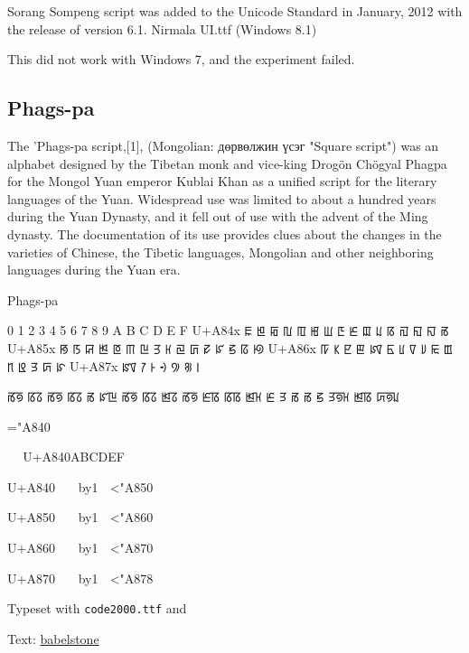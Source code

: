 Sorang Sompeng script was added to the Unicode Standard in January, 2012 with the release of version 6.1. Nirmala UI.ttf (Windows 8.1)



 	
This did not work with Windows 7, and the experiment failed. 

\subsection{Phags-pa}

The 'Phags-pa script,[1], (Mongolian: дөрвөлжин үсэг "Square script") was an alphabet designed by the Tibetan monk and vice-king Drogön Chögyal Phagpa for the Mongol Yuan emperor Kublai Khan as a unified script for the literary languages of the Yuan. Widespread use was limited to about a hundred years during the Yuan Dynasty, and it fell out of use with the advent of the Ming dynasty. The documentation of its use provides clues about the changes in the varieties of Chinese, the Tibetic languages, Mongolian and other neighboring languages during the Yuan era.

\newfontfamily{}

\begin{scriptexample}[]{Phags-pa}
\bgroup
\obeylines
\phagspa

 	0	1	2	3	4	5	6	7	8	9	A	B	C	D	E	F
U+A84x	ꡀ	ꡁ	ꡂ	ꡃ	ꡄ	ꡅ	ꡆ	ꡇ	ꡈ	ꡉ	ꡊ	ꡋ	ꡌ	ꡍ	ꡎ	ꡏ
U+A85x	ꡐ	ꡑ	ꡒ	ꡓ	ꡔ	ꡕ	ꡖ	ꡗ	ꡘ	ꡙ	ꡚ	ꡛ	ꡜ	ꡝ	ꡞ	ꡟ
U+A86x	ꡠ	ꡡ	ꡢ	ꡣ	ꡤ	ꡥ	ꡦ	ꡧ	ꡨ	ꡩ	ꡪ	ꡫ	ꡬ	ꡭ	ꡮ	ꡯ
U+A87x	ꡰ	ꡱ	ꡲ	ꡳ	꡴	꡵	꡶	


ꡏꡟ ꡋꡞ ꡏꡟ ꡋꡞ ꡏ ꡜꡖ ꡏꡟ ꡋꡞ ꡓꡞ ꡏꡟ
ꡈꡋ ꡋꡋ ꡓꡘ ꡈ ꡭ ꡏ ꡏ ꡝ ꡭꡟꡘ ꡓꡋ ꡮꡟꡊ
\egroup
\bgroup
\raggedright

\setcounter{glyphcount}{"A840}

\topline
\phagspa
\newcount\n
\n="A840

\def\htable{^^A
  \def\fm##1{\makebox[2em]##1}^^A
  U+A840\fm 0\fm1\fm2\fm3\fm4\fm5\fm 6\fm 7\fm 8\fm	9\fm A\fm B\fm C\fm D\fm E\fm F}

\htable\par
U+A840^^A 
\loop^^A
  \makebox[2em]{\char\n }^^A   
   \advance\n by1 ^^A
   \ifnum\n<"A850^^A
\repeat
\par U+A850^^A
\loop^^A
  \makebox[2em]{\char\n }^^A   
   \advance\n by1 ^^A
  \ifnum\n<"A860^^A
\repeat
\par U+A860^^A
\loop^^A
  \makebox[2em]{\char\n }^^A   
   \advance\n by1 ^^A
  \ifnum\n<"A870^^A
\repeat
\par U+A870^^A
\loop^^A
  \makebox[2em]{\char\n }^^A   
   \advance\n by1 ^^A
  \ifnum\n<"A878^^A
\repeat

\bottomline

\arial
\hfill Typeset with \texttt{code2000.ttf} and \cmd{\phagspa}

Text: \href{http://babelstone.blogspot.com/2006/12/phags-pa-fonts-1-babelstone-phags-pa.html}{babelstone}
\egroup
\end{scriptexample}

